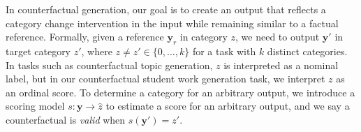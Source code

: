 \documentclass[letterpaper]{article} %
\newcommand{\ml}[1]{\textcolor{orange}{\bf [lan: #1]}}
\newcommand{\al}[1]{\textcolor{blue}{\bf [Alex: #1]}}
\begin{document}
In counterfactual generation, our goal is to create an output that reflects a category change intervention in the input while remaining similar to a factual reference. Formally, given a reference $\mathbf{y}_r$ in category $z$, we need to output $\mathbf{y}'$ in target category $z'$, where $z \neq z' \in \{0,\dots ,k\}$ for a task with $k$ distinct categories. 
In tasks such as counterfactual topic generation, $z$ is interpreted as a nominal label, but in our counterfactual student work generation task, we interpret $z$ as an ordinal score. To determine a category for an arbitrary output, we introduce a scoring model $s: \mathbf{y} \rightarrow \hat{z}$ to estimate a score for an arbitrary output, and we say a counterfactual is \emph{valid} when $s(\mathbf{y}')=z'$.






\end{document}
